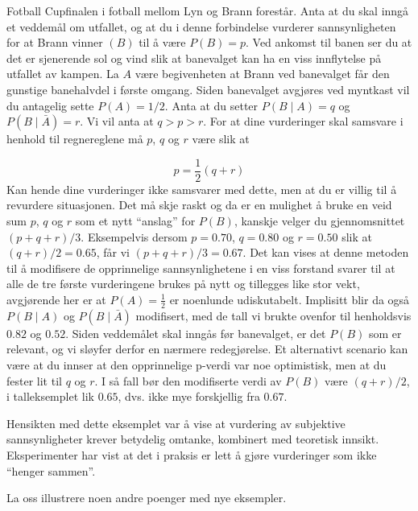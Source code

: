 \begin{eksempel}{Fotball}
Cupfinalen i fotball mellom Lyn og Brann forestår. Anta at du
skal inngå et veddemål om utfallet, og at du i denne forbindelse
vurderer sannsynligheten for at Brann vinner $(B)$ til å være
$P(B)=p$. Ved ankomst til banen ser du at det er sjenerende sol
og vind slik at banevalget kan ha en viss innflytelse på utfallet
av kampen. La $A$ være begivenheten at Brann ved banevalget får
den gunstige banehalvdel i første omgang. Siden banevalget
avgjøres ved myntkast vil du antagelig sette $P(A)=1/2$. Anta at
du setter $P(B\mid A)=q$ og $P(B\mid \bar{A})=r$. Vi vil anta at
$q>p>r$. For at dine vurderinger skal samsvare i henhold til
regnereglene må $p$, $q$ og $r$ være slik at

\[   p=\frac{1}{2}(q+r)    \]
Kan hende dine vurderinger ikke samsvarer med dette, men at du er
villig til å revurdere situasjonen. Det må skje raskt og da er en
mulighet å bruke en veid sum $p$, $q$ og $r$ som et nytt
``anslag'' for $P(B)$, kanskje velger du gjennomsnittet
$(p+q+r)/3$. Eksempelvis dersom $p=0.70$, $q=0.80$ og $r=0.50$
slik at $(q+r)/2=0.65$, får vi $(p+q+r)/3=0.67$. Det kan vises at
denne metoden til å modifisere de opprinnelige sannsynlighetene i
en viss forstand svarer til at alle de tre første vurderingene
brukes på nytt og tillegges like stor vekt, avgjørende her er at
$P(A)=\frac{1}{2}$  er noenlunde udiskutabelt. Implisitt blir da også
$P(B\mid A)$ og $P(B\mid \bar{A})$ modifisert, med de tall vi brukte
ovenfor til henholdsvis $0.82$ og $0.52$. Siden veddemålet skal
inngås før banevalget, er det $P(B)$ som er relevant, og vi
sløyfer derfor en nærmere redegjørelse. Et alternativt scenario
kan være at du innser at den opprinnelige p-verdi var noe
optimistisk, men at du fester lit til $q$ og $r$. I så fall bør
den modifiserte verdi av $P(B)$ være $(q+r)/2$, i talleksemplet
lik $0.65$, dvs. ikke mye forskjellig fra $0.67$.
\end{eksempel}

Hensikten med dette eksemplet var å vise at vurdering av subjektive
sannsynligheter krever betydelig omtanke, kombinert med teoretisk innsikt. 
Eksperimenter har vist at det i praksis er lett å gjøre vurderinger
som ikke ``henger sammen''.

La oss illustrere noen andre poenger med nye eksempler.\\

